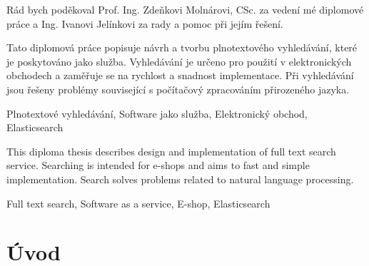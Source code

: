 \documentclass[FM,DP]{tulthesis}
\begin{document}


\begin{acknowledgement}
Rád bych poděkoval Prof. Ing. Zdeňkovi Molnárovi, CSc. za vedení mé diplomové práce
a Ing. Ivanovi Jelínkovi za rady a pomoc při jejím řešení.
\end{acknowledgement}


\begin{abstractCZ}
Tato diplomová práce popisuje návrh a tvorbu plnotextového vyhledávání, které je poskytováno jako služba.
Vyhledávání je určeno pro použití v elektronických obchodech a zaměřuje se na rychlost a snadnost
implementace. Při vyhledávání jsou řešeny problémy související s počítačový zpracováním přirozeného
jazyka.
\end{abstractCZ}
\vspace{1cm}
\begin{klicovaslovaCZ}
Plnotextové vyhledávání, Software jako služba, Elektronický obchod, Elasticsearch
\end{klicovaslovaCZ}

\vspace{2cm}

\begin{abstractEN}
This diploma thesis describes design and implementation of full text search service.
Searching is intended for e-shops and aims to fast and simple implementation.
Search solves problems related to natural language processing.
\end{abstractEN}
\vspace{1cm}
\begin{klicovaslovaEN}
Full text search, Software as a service, E-shop, Elasticsearch
\end{klicovaslovaEN}


\setcounter{page}{2}
\tableofcontents
\clearpage

\listoffigures
\clearpage

\listoftables
\clearpage

\listoflistings
\clearpage


\chapter{Úvod}
\end{document}
